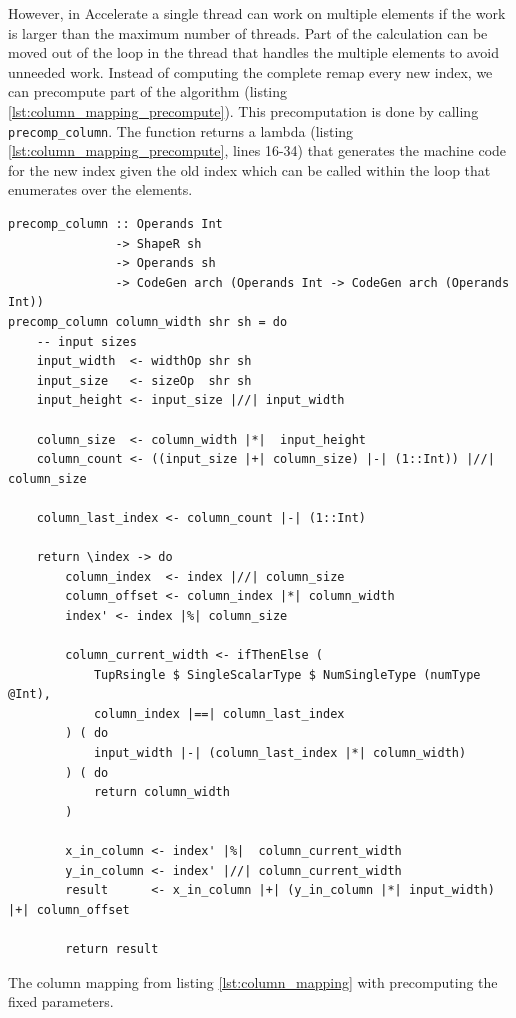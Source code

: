 However, in Accelerate a single thread can work on multiple elements if the work is larger than the maximum number of threads.
Part of the calculation can be moved out of the loop in the thread that handles the multiple elements to avoid unneeded work.
Instead of computing the complete remap every new index, we can precompute part of the algorithm (listing \ref{lst:column_mapping_precompute}).
This precomputation is done by calling \texttt{precomp\_column}.
The function returns a lambda (listing \ref{lst:column_mapping_precompute}, lines 16-34) that generates the machine code for the new index given the old index which can be called within the loop that enumerates over the elements.

\begin{listing}[ht]
    \begin{verbatim}
precomp_column :: Operands Int 
               -> ShapeR sh 
               -> Operands sh 
               -> CodeGen arch (Operands Int -> CodeGen arch (Operands Int))
precomp_column column_width shr sh = do
    -- input sizes
    input_width  <- widthOp shr sh
    input_size   <- sizeOp  shr sh
    input_height <- input_size |//| input_width
    
    column_size  <- column_width |*|  input_height
    column_count <- ((input_size |+| column_size) |-| (1::Int)) |//| column_size

    column_last_index <- column_count |-| (1::Int)

    return \index -> do
        column_index  <- index |//| column_size
        column_offset <- column_index |*| column_width
        index' <- index |%| column_size

        column_current_width <- ifThenElse (
            TupRsingle $ SingleScalarType $ NumSingleType (numType @Int), 
            column_index |==| column_last_index
        ) ( do
            input_width |-| (column_last_index |*| column_width)
        ) ( do
            return column_width
        )
        
        x_in_column <- index' |%|  column_current_width
        y_in_column <- index' |//| column_current_width
        result      <- x_in_column |+| (y_in_column |*| input_width) |+| column_offset

        return result
    \end{verbatim}
    \caption{
        The column mapping from listing \ref{lst:column_mapping} with precomputing the fixed parameters.
    }
    \label{lst:column_mapping_precompute}
\end{listing}

